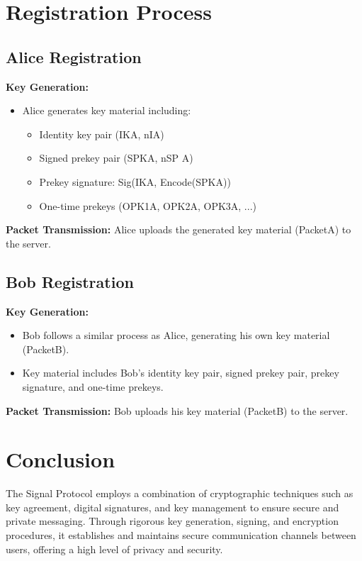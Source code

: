 \documentclass[11pt]{article}
\begin{document}
\section{Registration Process}

\subsection{Alice Registration}
\textbf{Key Generation:}
\begin{itemize}
    \item Alice generates key material including:
    \begin{itemize}
        \item Identity key pair (IKA, nIA)
        \item Signed prekey pair (SPKA, nSP A)
        \item Prekey signature: Sig(IKA, Encode(SPKA))
        \item One-time prekeys (OPK1A, OPK2A, OPK3A, ...)
    \end{itemize}
\end{itemize}

\textbf{Packet Transmission:} Alice uploads the generated key material (PacketA) to the server.

\subsection{Bob Registration}
\textbf{Key Generation:}
\begin{itemize}
    \item Bob follows a similar process as Alice, generating his own key material (PacketB).
    \item Key material includes Bob's identity key pair, signed prekey pair, prekey signature, and one-time prekeys.
\end{itemize}

\textbf{Packet Transmission:} Bob uploads his key material (PacketB) to the server.

\section*{Conclusion}
The Signal Protocol employs a combination of cryptographic techniques such as key agreement, digital signatures, and key management to ensure secure and private messaging. Through rigorous key generation, signing, and encryption procedures, it establishes and maintains secure communication channels between users, offering a high level of privacy and security.
\end{document}
